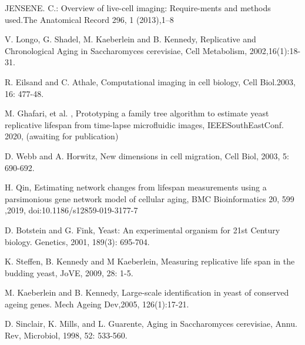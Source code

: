 \documentclass[conference]{IEEEtran}
\begin{document}
\begin{thebibliography}{00}
JENSENE. C.: Overview of live-cell imaging: Require-ments and methods used.The Anatomical Record 296, 1 (2013),1–8


V. Longo, G. Shadel, M. Kaeberlein and B.  Kennedy, Replicative and Chronological Aging in Saccharomyces cerevisiae, Cell Metabolism, 2002,16(1):18-31.




R. Eilsand and C. Athale, Computational imaging in cell biology, Cell Biol.2003, 16: 477-48.

M. Ghafari,  et al. , Prototyping a family tree algorithm to estimate yeast replicative lifespan from time-lapse microfluidic images, IEEESouthEastConf. 2020, (awaiting for publication)



D. Webb and A. Horwitz, New dimensions in cell migration, Cell Biol, 2003,  5: 690-692.


H. Qin, Estimating network changes from lifespan measurements using a parsimonious gene network model of cellular aging, BMC Bioinformatics 20, 599 ,2019, doi:10.1186/s12859-019-3177-7



D. Botstein and G. Fink, Yeast: An experimental organism for 21st Century biology. Genetics, 2001, 189(3): 695-704.



K. Steffen, B. Kennedy and M Kaeberlein, Measuring replicative life span in the budding yeast, JoVE, 2009,  28: 1-5.


M. Kaeberlein and B. Kennedy, Large-scale identification in yeast of conserved ageing genes. Mech Ageing Dev,2005, 126(1):17-21.


D. Sinclair, K. Mills, and L. Guarente,  Aging in Saccharomyces cerevisiae, Annu. Rev,  Microbiol, 1998, 52: 533-560.




\end{thebibliography}
\end{document}
